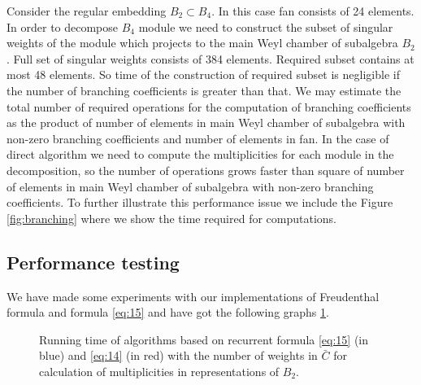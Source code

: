 \documentclass[preprint,12pt]{elsarticle}
\begin{document}
Consider the regular embedding $B_{2}\subset B_{4}$. In this case fan consists of 24 elements. In order to decompose $B_{4}$ module we need to construct the subset of singular weights of the module which projects to the main Weyl chamber of subalgebra $B_{2}$. Full set of singular weights consists of 384 elements. Required subset contains at most 48 elements. So time of the construction of required subset is negligible if the number of branching coefficients is greater than that. We may estimate the total number of required operations for the computation of branching coefficients as the product of number of elements in main Weyl chamber of subalgebra with non-zero branching coefficients and number of elements in fan. In the case of direct algorithm we need to compute the multiplicities for each module in the decomposition, so the number of operations grows faster than square of number of elements in main Weyl chamber of subalgebra with non-zero branching coefficients. 
To further illustrate this performance issue we include the Figure \ref{fig:branching} where we show the time required for computations.




\subsection{Performance testing}
\label{sec:performance-testing}

We have made some experiments with our implementations of Freudenthal formula and formula \eqref{eq:15} and have got the following graphs \ref{freudenthal-racah-times}.
\begin{figure}[h]
  \label{freudenthal-racah-times}
  \noindent{}
  \caption{Running time of algorithms based on recurrent formula \eqref{eq:15} (in blue) and \eqref{eq:14} (in red) with the number of weights in $\bar C$ for calculation of multiplicities in representations of $B_{2}$.}
\end{figure}
\end{document}
